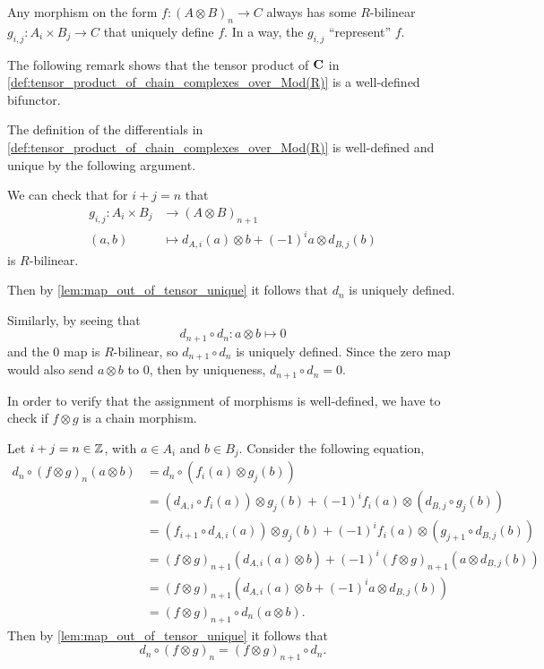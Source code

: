 Any morphism on the form \( f: (A \otimes B)_n \to C \) always has some \( R \)-bilinear \( g_{i, j}: A_i \times B_j \to C \) that uniquely define \( f \). In a way, the \( g_{i, j} \) ``represent'' \( f \).

The following remark shows that the tensor product of \( \operatorname{\mathbf{C}} \) in \autoref{def:tensor_product_of_chain_complexes_over_Mod(R)} is a well-defined bifunctor.

\begin{remark}
    \label{rem:c_tensor_bifunctor}
    The definition of the differentials in \autoref{def:tensor_product_of_chain_complexes_over_Mod(R)} is well-defined and unique by the following argument.

    We can check that for \( i + j = n \) that
    \begin{align*}
        g_{i, j}: A_i \times B_j &\to (A \otimes B)_{n + 1} \\
        (a, b) &\mapsto d_{A, i}(a) \otimes b + (-1)^i a \otimes d_{B, j}(b)
    \end{align*}
    is \( R \)-bilinear.

    Then by \autoref{lem:map_out_of_tensor_unique} it follows that \( d_n \) is uniquely defined.

    Similarly, by seeing that
    \[
        d_{n + 1} \circ d_n: a \otimes b \mapsto 0
    \]
    and the \( 0 \) map is \( R \)-bilinear, so \( d_{n + 1} \circ d_n \) is uniquely defined. Since the zero map would also send \( a \otimes b \) to \( 0 \), then by uniqueness, \( d_{n + 1} \circ d_n = 0 \).

    In order to verify that the assignment of morphisms is well-defined, we have to check if \( f \otimes g \) is a chain morphism.
    
    Let \( i + j = n \in {\mathbb{Z}} \), with \( a \in A_i \) and \( b \in B_j \). Consider the following equation,
    \begin{align*}
        d_n \circ (f \otimes g)_n (a \otimes b) &= d_n \circ (f_i(a) \otimes g_j(b)) \\
        &= (d_{A, i} \circ f_i(a)) \otimes g_j(b) + (-1)^i f_i(a) \otimes (d_{B, j} \circ g_j(b)) \\
        &= (f_{i + 1} \circ d_{A, i} (a)) \otimes g_j (b) + (-1)^i f_i(a) \otimes (g_{j + 1} \circ d_{B, j}(b)) \\
        &= (f \otimes g)_{n + 1} (d_{A, i}(a) \otimes b) + (-1)^i (f \otimes g)_{n + 1} (a \otimes d_{B, j}(b)) \\
        &= (f \otimes g)_{n + 1} (d_{A, i} (a) \otimes b + (-1)^i a \otimes d_{B, j} (b)) \\
        &= (f \otimes g)_{n + 1} \circ d_n (a \otimes b).
    \end{align*}
    Then by \autoref{lem:map_out_of_tensor_unique} it follows that
    \[
        d_n \circ (f \otimes g)_n = (f \otimes g)_{n + 1} \circ d_n.
    \]


\end{remark}
